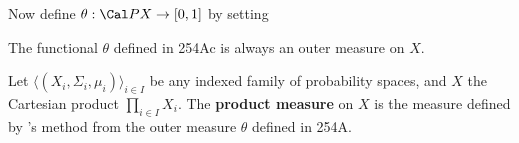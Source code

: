  Now define $\theta:\Cal PX\to[0,1]$ by setting


 The functional $\theta$ defined in 254Ac is always
an outer measure on $X$.


 Let
$\langle(X_i,\Sigma_i,\mu_i)\rangle_{i\in I}$ be any indexed family of
probability spaces, and $X$ the Cartesian
product $\prod_{i\in I}X_i$.   The {\bf product measure} on $X$ is the
measure defined by \Caratheodory's method from the
outer measure $\theta$ defined in 254A.

